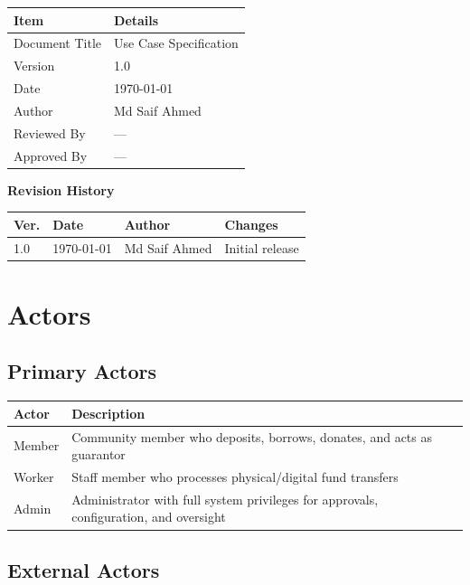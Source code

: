 \documentclass[11pt,a4paper]{article}
\newcommand{\DocumentTitle}{Use Case Specification}
\newcommand{\DocumentVersion}{1.0}
\newcommand{\DocumentDate}{\today}
\begin{document}
\begin{tabular}{@{}p{3cm}p{10cm}@{}}
\toprule
\textbf{Item} & \textbf{Details} \\
\midrule
Document Title & \DocumentTitle \\
Version & \DocumentVersion \\
Date & \DocumentDate \\
Author & Md Saif Ahmed \\
Reviewed By & --- \\
Approved By & --- \\
\bottomrule
\end{tabular}

\vspace{1em}

\textbf{Revision History}

\begin{tabular}{@{}p{1.2cm}p{2.5cm}p{3.5cm}p{5.5cm}@{}}
\toprule
\textbf{Ver.} & \textbf{Date} & \textbf{Author} & \textbf{Changes} \\
\midrule
1.0 & \DocumentDate & Md Saif Ahmed & Initial release \\
\bottomrule
\end{tabular}

\newpage

\section{Actors}

\subsection{Primary Actors}

\begin{tabular}{@{}p{3cm}p{10cm}@{}}
\toprule
\textbf{Actor} & \textbf{Description} \\
\midrule
Member & Community member who deposits, borrows, donates, and acts as guarantor \\
\addlinespace
Worker & Staff member who processes physical/digital fund transfers \\
\addlinespace
Admin & Administrator with full system privileges for approvals, configuration, and oversight \\
\bottomrule
\end{tabular}

\subsection{External Actors}
\end{document}
